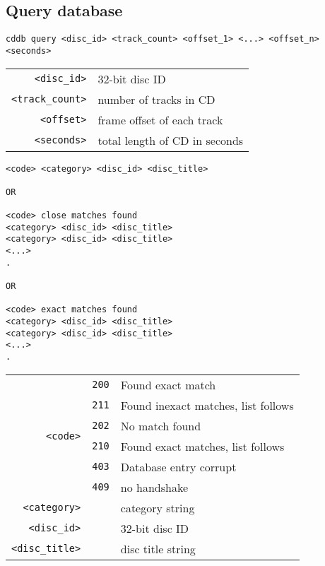 \subsection{Query database}
\begin{Verbatim}[frame=single,label=\textit{To Server},showspaces=true]
cddb query <disc_id> <track_count> <offset_1> <...> <offset_n> <seconds>
\end{Verbatim}
\begin{tabular}{rl}
\texttt{<disc\_id>} & 32-bit disc ID \\
\texttt{<track\_count>} & number of tracks in CD \\
\texttt{<offset>} & frame offset of each track \\
\texttt{<seconds>} & total length of CD in seconds
\end{tabular}
\begin{Verbatim}[frame=single,label=\textit{From Server},showspaces=true]
<code> <category> <disc_id> <disc_title>

OR

<code> close matches found
<category> <disc_id> <disc_title>
<category> <disc_id> <disc_title>
<...>
.

OR

<code> exact matches found
<category> <disc_id> <disc_title>
<category> <disc_id> <disc_title>
<...>
.
\end{Verbatim}
\begin{tabular}{rcl}
\multirow{6}{3em}{\texttt{<code>}}
& \texttt{200} & Found exact match \\
& \texttt{211} & Found inexact matches, list follows \\
& \texttt{202} & No match found \\
& \texttt{210} & Found exact matches, list follows \\
& \texttt{403} & Database entry corrupt \\
& \texttt{409} & no handshake \\
\texttt{<category>} & & category string \\
\texttt{<disc\_id>} & & 32-bit disc ID \\
\texttt{<disc\_title>} & & disc title string
\end{tabular}

\pagebreak


